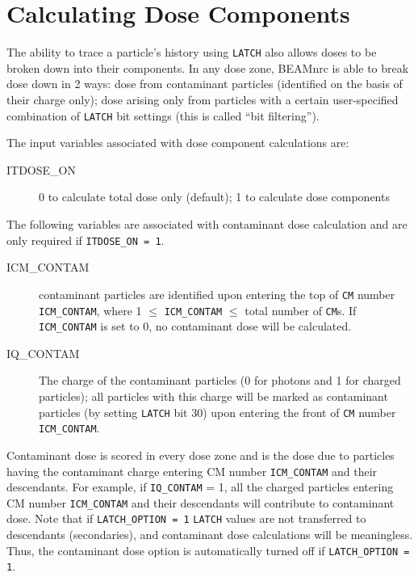\documentclass[12pt,twoside]{article}
\begin{document}
\clearpage

\section{Calculating Dose Components}
\label{dosecompsect}

The ability to trace a particle's history using \verb+LATCH+ also allows doses
to be broken down into their components.  In any dose zone, BEAMnrc is able
to break dose down in 2 ways:
dose from contaminant particles (identified on
the basis of their charge only); dose
arising only from particles with a certain user-specified combination of
\verb+LATCH+ bit settings (this is called ``bit filtering'').

The input variables associated with dose component calculations are:
\begin{description}
\item [ITDOSE\_ON] 0 to calculate total dose only (default);
1 to calculate dose components
\end{description}


The following variables are associated with contaminant dose calculation
and are only required if  \verb+ITDOSE_ON = 1+.
\begin{description}
\item [ICM\_CONTAM] contaminant particles are identified upon entering
the top of \verb+CM+ number \verb+ICM_CONTAM+, where 1 $\leq$ \verb+ICM_CONTAM+
$\leq$ total number of \verb+CM+s.  If \verb+ICM_CONTAM+
is set to 0, no contaminant dose will be calculated.
\item [IQ\_CONTAM] The charge of the contaminant particles (0 for photons
and 1 for charged particles); all particles
with this charge will be marked as contaminant particles (by setting
\verb+LATCH+ bit 30)
upon entering the front of \verb+CM+ number \verb+ICM_CONTAM+.
\end{description}
Contaminant dose is scored in every dose zone and is the dose due to particles
having the contaminant charge entering CM number \verb+ICM_CONTAM+ and their
descendants. For example, if \verb+IQ_CONTAM+ = 1, all the charged particles
entering CM number \verb+ICM_CONTAM+ and their descendants will contribute to
contaminant dose. Note that if \verb+LATCH_OPTION = 1+
\verb+LATCH+ values are not transferred to descendants (secondaries),
and contaminant dose calculations will be
meaningless.  Thus, the contaminant dose option is automatically
turned off if \verb+LATCH_OPTION = 1+.
\end{document}
